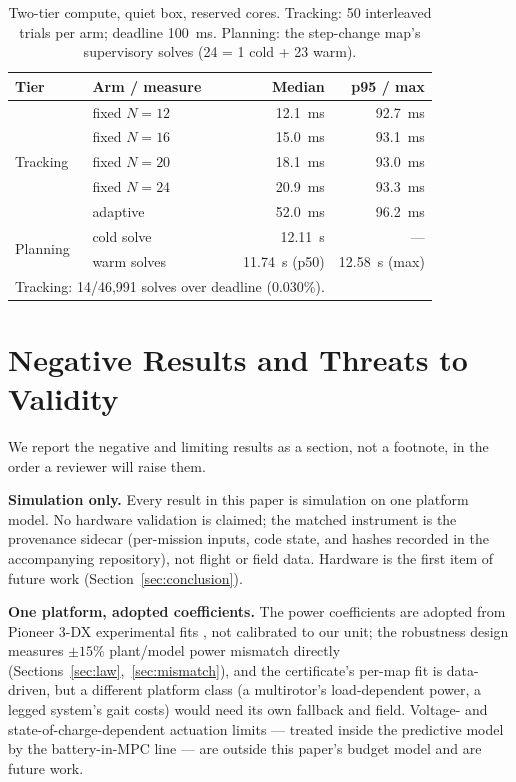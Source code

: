 \documentclass[preprint,12pt]{elsarticle}
\begin{document}
\begin{table}[!t]
\caption{Two-tier compute, quiet box, reserved cores. Tracking:
50 interleaved trials per arm; deadline 100~ms. Planning: the
step-change map's supervisory solves (24 = 1 cold + 23 warm).}
\label{tab:timing}
\centering
\begin{tabular}{llrr}
\toprule
Tier & Arm / measure & Median & p95 / max\\
\midrule
\multirow{5}{*}{Tracking}
 & fixed $N{=}12$ & 12.1~ms & 92.7~ms\\
 & fixed $N{=}16$ & 15.0~ms & 93.1~ms\\
 & fixed $N{=}20$ & 18.1~ms & 93.0~ms\\
 & fixed $N{=}24$ & 20.9~ms & 93.3~ms\\
 & adaptive & 52.0~ms & 96.2~ms\\
\midrule
\multirow{2}{*}{Planning}
 & cold solve & 12.11~s & ---\\
 & warm solves & 11.74~s (p50) & 12.58~s (max)\\
\bottomrule
\multicolumn{3}{l}{\footnotesize Tracking: 14/46{,}991 solves over deadline (0.030\%).}
\end{tabular}
\end{table}

\section{Negative Results and Threats to Validity}
\label{sec:negatives}

We report the negative and limiting results as a section, not a
footnote, in the order a reviewer will raise them.

\textbf{Simulation only.} Every result in this paper is simulation on
one platform model. No hardware validation is claimed; the matched
instrument is the provenance sidecar (per-mission inputs, code state,
and hashes recorded in the accompanying repository), not flight or
field data. Hardware is the first item of future work
(Section~\ref{sec:conclusion}).

\textbf{One platform, adopted coefficients.} The power coefficients
are adopted from Pioneer 3-DX experimental fits
\cite{jaiem2021energy}, not calibrated to our unit; the robustness
design measures $\pm 15\%$ plant/model power mismatch directly
(Sections~\ref{sec:law},~\ref{sec:mismatch}), and the certificate's
per-map fit is data-driven, but a different platform class
(a multirotor's load-dependent power, a legged system's gait costs)
would need its own fallback and field. Voltage- and
state-of-charge-dependent actuation limits --- treated inside the
predictive model by the battery-in-MPC line
\cite{gupta2026bcnmpc, kidambi2026battery} --- are outside this
paper's budget model and are future work.
\end{document}
